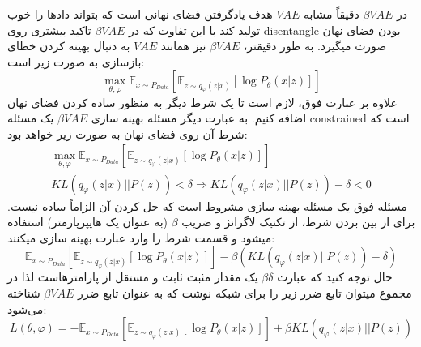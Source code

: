 \begin{enumerate}[label=(\alph*)]
 	در
 	$\beta VAE$
 	دقیقاً مشابه
 	$VAE$
 	هدف یادگرفتن فضای نهانی است که بتواند دادها را خوب تولید کند با این تفاوت که در
 	$\beta VAE$
 	تاکید بیشتری روی disentangle بودن فضای نهان صورت میگیرد. به طور دقیقتر،
 	$\beta VAE$
 	نیز همانند
 	$VAE$
 	به دنبال بهینه کردن خطای بازسازی به صورت زیر است:
 	$$
 	\mathop {\max }\limits_{\theta ,\varphi } {\mathbb{E}_{x \sim {P_{Data}}}}\left[ {{\mathbb{E}_{z \sim {q_\varphi }\left( {z|x} \right)}}\left[ {\log {P_\theta }\left( {x|z} \right)} \right]} \right]
 	$$
 	علاوه بر عبارت فوق، لازم است تا یک شرط دیگر به منظور ساده کردن فضای نهان اضافه کنیم. به عبارت دیگر مسئله بهینه سازی
 	$\beta VAE$
 	یک مسئله constrained است که شرط آن روی فضای نهان به صورت زیر خواهد بود:
 	$$
 	\begin{array}{l}
 		\mathop {\max }\limits_{\theta ,\varphi } {\mathbb{E}_{x \sim {P_{Data}}}}\left[ {{\mathbb{E}_{z \sim {q_\varphi }\left( {z|x} \right)}}\left[ {\log {P_\theta }\left( {x|z} \right)} \right]} \right]\\
 		KL\left( {{q_\varphi }\left( {z|x} \right)||P\left( z \right)} \right) < \delta  \Rightarrow KL\left( {{q_\varphi }\left( {z|x} \right)||P\left( z \right)} \right) - \delta  < 0
 	\end{array}
 	$$
 	مسئله فوق یک مسئله بهینه سازی مشروط است که حل کردن آن الزاماً ساده نیست. برای از بین بردن شرط، از تکنیک لاگرانژ و ضریب
 	$\beta$
 	(به عنوان یک هایپرپارمتر) استفاده میشود و قسمت شرط را وارد عبارت بهینه سازی میکنند:
 	$$
 	{\mathbb{E}_{x \sim {P_{Data}}}}\left[ {{\mathbb{E}_{z \sim {q_\varphi }\left( {z|x} \right)}}\left[ {\log {P_\theta }\left( {x|z} \right)} \right]} \right] - \beta \left( {KL\left( {{q_\varphi }\left( {z|x} \right)||P\left( z \right)} \right) - \delta } \right)
 	$$
 	حال توجه کنید که عبارت
 	$\beta \delta$
 	یک مقدار مثبت ثابت و مستقل از پارامترهاست لذا در مجموع میتوان تابع ضرر زیر را برای شبکه نوشت که به عنوان تابع ضرر
 	$\beta VAE$
 	شناخته می‌شود:
 	$$
 	L\left( {\theta ,\varphi } \right) =  - {\mathbb{E}_{x \sim {P_{Data}}}}\left[ {{\mathbb{E}_{z \sim {q_\varphi }\left( {z|x} \right)}}\left[ {\log {P_\theta }\left( {x|z} \right)} \right]} \right] + \beta KL\left( {{q_\varphi }\left( {z|x} \right)||P\left( z \right)} \right)
 	$$
\end{enumerate}